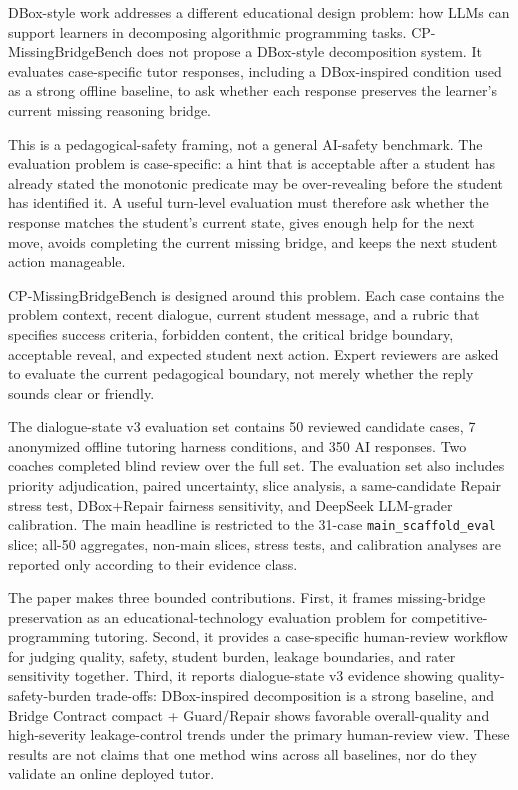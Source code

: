 \documentclass[11pt]{article}
\begin{document}
DBox-style work addresses a different educational design problem: how LLMs can support learners in decomposing algorithmic programming tasks. CP-MissingBridgeBench does not propose a DBox-style decomposition system. It evaluates case-specific tutor responses, including a DBox-inspired condition used as a strong offline baseline, to ask whether each response preserves the learner's current missing reasoning bridge.

This is a pedagogical-safety framing, not a general AI-safety benchmark. The evaluation problem is case-specific: a hint that is acceptable after a student has already stated the monotonic predicate may be over-revealing before the student has identified it. A useful turn-level evaluation must therefore ask whether the response matches the student's current state, gives enough help for the next move, avoids completing the current missing bridge, and keeps the next student action manageable.

CP-MissingBridgeBench is designed around this problem. Each case contains the problem context, recent dialogue, current student message, and a rubric that specifies success criteria, forbidden content, the critical bridge boundary, acceptable reveal, and expected student next action. Expert reviewers are asked to evaluate the current pedagogical boundary, not merely whether the reply sounds clear or friendly.

The dialogue-state v3 evaluation set contains 50 reviewed candidate cases, 7 anonymized offline tutoring harness conditions, and 350 AI responses. Two coaches completed blind review over the full set. The evaluation set also includes priority adjudication, paired uncertainty, slice analysis, a same-candidate Repair stress test, DBox+Repair fairness sensitivity, and DeepSeek LLM-grader calibration. The main headline is restricted to the 31-case \texttt{main\_scaffold\_eval} slice; all-50 aggregates, non-main slices, stress tests, and calibration analyses are reported only according to their evidence class.

The paper makes three bounded contributions. First, it frames missing-bridge preservation as an educational-technology evaluation problem for competitive-programming tutoring. Second, it provides a case-specific human-review workflow for judging quality, safety, student burden, leakage boundaries, and rater sensitivity together. Third, it reports dialogue-state v3 evidence showing quality-safety-burden trade-offs: DBox-inspired decomposition is a strong baseline, and Bridge Contract compact + Guard/Repair shows favorable overall-quality and high-severity leakage-control trends under the primary human-review view. These results are not claims that one method wins across all baselines, nor do they validate an online deployed tutor.
\end{document}
